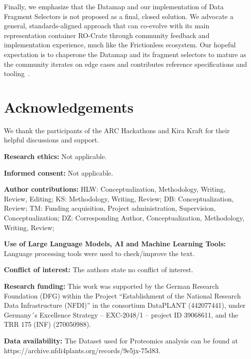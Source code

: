 \documentclass{jib}
\begin{document}
Finally, we emphasize that the Datamap and our implementation of Data Fragment Selectors is not proposed as a final, closed solution. We advocate a general, standards-aligned approach that can co-evolve with its main representation container RO-Crate through community feedback and implementation experience, much like the Frictionless ecosystem. Our hopeful expectation is to chaperone the Datamap and its fragment selectors to mature as the community iterates on edge cases and contributes reference specifications and tooling~\cite{soilandreyes2022rocrate,fowler2017frictionless}.

                                                   
%
%
\section*{Acknowledgements}

We thank the participants of the ARC Hackathons and Kira Kraft for their helpful discussions and support.

\textbf{Research ethics:} Not applicable.

\textbf{Informed consent:} Not applicable.

\textbf{Author contributions:} HLW: Conceptualization, Methodology, Writing, Review, Editing; KS: Methodology, Writing, Review; DB: Conceptualization, Review; TM: Funding acquisition, Project administration, Supervision, Conceptualization; DZ: Corresponding Author, Conceptualization, Methodology, Writing, Review;

\textbf{Use of Large Language Models, AI and Machine Learning Tools:} Language processing tools were used to check/improve the text.

\textbf{Conflict of interest:} The authors state no conflict of interest.

\textbf{Research funding:} This work was supported by the German Research Foundation (DFG) within the Project “Establishment of the National Research Data Infrastructure (NFDI)” in the consortium DataPLANT (442077441), under Germany´s Excellence Strategy – EXC-2048/1 – project ID 39068611, and the TRR 175 (INF) (270050988).

\textbf{Data availability:} The Dataset used for Proteomics analysis can be found at https://archive.nfdi4plants.org/records/9e5jx-75d83.



%
%
\end{document}
